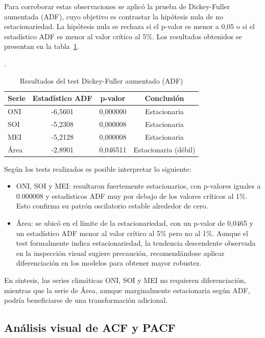 Para corroborar estas observaciones se aplicó la prueba de Dickey-Fuller aumentada (ADF), cuyo objetivo es contrastar la hipótesis nula de no estacionariedad. La hipótesis nula se rechaza si el p-valor es menor a 0,05 o si el estadístico ADF es menor al valor crítico al 5\%. Los resultados obtenidos se presentan en la tabla~\ref{tab:adf_test}.

\begin{table}[H]
    \centering
    \caption{Resultados del test Dickey-Fuller aumentado (ADF)}.
    \label{tab:adf_test}
    \begin{tabular}{lccc}
        \toprule
        \textbf{Serie} & \textbf{Estadístico ADF} & \textbf{p-valor} & \textbf{Conclusión} \\
        \midrule
        ONI  & -6,5601 & 0,000000 & Estacionaria \\
        SOI  & -5,2308 & 0,000008 & Estacionaria \\
        MEI  & -5,2128 & 0,000008 & Estacionaria \\
        Área & -2,8901 & 0,046511 & Estacionaria (débil) \\
        \bottomrule
    \end{tabular}
\end{table}

Según los tests realizados es posible interpretar lo siguiente:   
\begin{itemize}
    \item ONI, SOI y MEI: resultaron fuertemente estacionarios, con p-valores 
    iguales a 0.000008 y estadísticos ADF muy por debajo de los valores críticos al 1\%. 
    Esto confirma su patrón oscilatorio estable alrededor de cero.
    \item Área: se ubicó en el límite de la estacionariedad, con un p-valor de 
    0,0465 y un estadístico ADF menor al valor crítico al 5\% pero no al 1\%. Aunque el 
    test formalmente indica estacionariedad, la tendencia descendente observada en la 
    inspección visual sugiere precaución, recomendándose aplicar diferenciación en los 
    modelos para obtener mayor robustez.
\end{itemize}


En síntesis, las series climáticas ONI, SOI y MEI no requieren diferenciación, mientras que 
la serie de Área, aunque marginalmente estacionaria según ADF, podría beneficiarse de 
una transformación adicional.

\subsection{Análisis visual de ACF y PACF}

